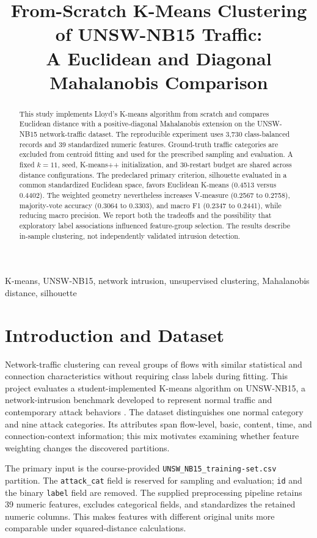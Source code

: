 \documentclass[conference]{IEEEtran}
\title{From-Scratch K-Means Clustering of UNSW-NB15 Traffic:\\A Euclidean and Diagonal Mahalanobis Comparison}
\author{\IEEEauthorblockN{Jonathan Morse}\IEEEauthorblockA{CSEC 620 --- Cyber Analytics and Machine Learning\\Rochester Institute of Technology\\RIT ID: jam7142}}
\begin{document}
\maketitle
\begin{abstract}
This study implements Lloyd's K-means algorithm from scratch and compares Euclidean distance with a positive-diagonal Mahalanobis extension on the UNSW-NB15 network-traffic dataset. The reproducible experiment uses 3,730 class-balanced records and 39 standardized numeric features. Ground-truth traffic categories are excluded from centroid fitting and used for the prescribed sampling and evaluation. A fixed $k=11$, seed, K-means++ initialization, and 30-restart budget are shared across distance configurations. The predeclared primary criterion, silhouette evaluated in a common standardized Euclidean space, favors Euclidean K-means (0.4513 versus 0.4402). The weighted geometry nevertheless increases V-measure (0.2567 to 0.2758), majority-vote accuracy (0.3064 to 0.3303), and macro F1 (0.2347 to 0.2441), while reducing macro precision. We report both the tradeoffs and the possibility that exploratory label associations influenced feature-group selection. The results describe in-sample clustering, not independently validated intrusion detection.
\end{abstract}
\begin{IEEEkeywords}
K-means, UNSW-NB15, network intrusion, unsupervised clustering, Mahalanobis distance, silhouette
\end{IEEEkeywords}

\section{Introduction and Dataset}
Network-traffic clustering can reveal groups of flows with similar statistical and connection characteristics without requiring class labels during fitting. This project evaluates a student-implemented K-means algorithm on UNSW-NB15, a network-intrusion benchmark developed to represent normal traffic and contemporary attack behaviors \cite{moustafa2015}. The dataset distinguishes one normal category and nine attack categories. Its attributes span flow-level, basic, content, time, and connection-context information; this mix motivates examining whether feature weighting changes the discovered partitions.

The primary input is the course-provided \texttt{UNSW\_NB15\_training-set.csv} partition. The \texttt{attack\_cat} field is reserved for sampling and evaluation; \texttt{id} and the binary \texttt{label} field are removed. The supplied preprocessing pipeline retains 39 numeric features, excludes categorical fields, and standardizes the retained numeric columns. This makes features with different original units more comparable under squared-distance calculations.
\end{document}
